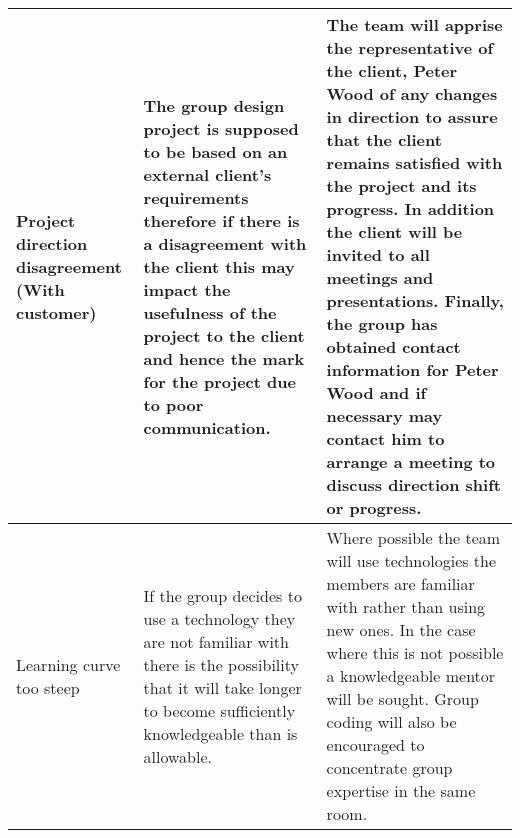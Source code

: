 \begin{center}
\begin{landscape}
\begin{longtable}{|p{3cm}|p{7cm}|p{12cm}|}
        Project direction disagreement (With customer)   & The group design project is supposed to be based on an external client's requirements therefore if there is a disagreement with the client this may impact the usefulness of the project to the client and hence the mark for the project due to poor communication.                                                                                                         & The team will apprise the representative of the client, Peter Wood of any changes in direction to assure that the client remains satisfied with the project and its progress. In addition the client will be invited to all meetings and presentations. Finally, the group has obtained contact information for Peter Wood and if necessary may contact him to arrange a meeting to discuss direction shift or progress.                                                                                                                                                                                                                                                                                                                                                                                                                                                                                                                                                                                                                 \\ \hline
        Learning curve too steep                         & If the group decides to use a technology they are not familiar with there is the possibility that it will take longer to become sufficiently knowledgeable than is allowable.                                                                                                                                                                                                & Where possible the team will use technologies the members are familiar with rather than using new ones. In the case where this is not possible a knowledgeable mentor will be sought. Group coding will also be encouraged to concentrate group expertise in the same room.                                                                                                                                                                                                                                                                                                                                                                                                                                                                                                                                                                                                                                                                                                                                                              \\ \hline

\end{longtable}
\end{landscape}
\end{center}
